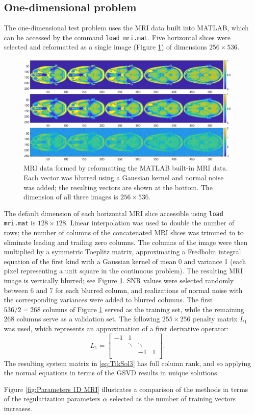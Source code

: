 \documentclass[12pt]{article}
\begin{document}
\subsection{One-dimensional problem} \label{sec:1D}
The one-dimensional test problem uses the MRI data built into MATLAB, which can be accessed by the command \texttt{load mri.mat}. Five horizontal slices were selected and reformatted as a single image (Figure \ref{fig:MRI 1D}) of dimensions $256 \times 536$. 
\begin{figure}[ht]
\includegraphics[scale=0.32]{Figures/Full_MRI_Data.eps}
\caption{MRI data formed by reformatting the MATLAB built-in MRI data. Each vector was blurred using a Gaussian kernel and normal noise was added; the resulting vectors are shown at the bottom. The dimension of all three images is $256 \times 536$.}
\label{fig:MRI 1D}
\end{figure}
The default dimension of each horizontal MRI slice accessible using \texttt{load mri.mat} is $128 \times 128$. Linear interpolation was used to double the number of rows; the number of columns of the concatenated MRI slices was trimmed to to eliminate leading and trailing zero columns. The columns of the image were then multiplied by a symmetric Toeplitz matrix, approximating a Fredholm integral equation of the first kind with a Gaussian kernel of mean 0 and variance 1 (each pixel representing a unit square in the continuous problem). The resulting MRI image is vertically blurred; see Figure \ref{fig:MRI 1D}. SNR values were selected randomly between 6 and 7 for each blurred column, and realizations of normal noise with the corresponding variances were added to blurred columns. The first $536/2 = 268$ columns of Figure \ref{fig:MRI 1D} served as the training set, while the remaining 268 columns serve as a validation set.  The following $255 \times 256$ penalty matrix $L_1$ was used, which represents an approximation of a first derivative operator:
\[L_1 = \begin{bmatrix}
-1 & 1 & &  \\
 & \ddots &  \ddots & \\
 & & -1 & 1 \\
\end{bmatrix}.\]
The resulting system matrix in \eqref{eq:TikSol3} has full column rank, and so applying the normal equations in terms of the GSVD results in unique solutions. \par 
Figure \ref{fig:Parameters 1D MRI} illustrates a comparison of the methods in terms of the regularization parameters $\alpha$ selected as the number of training vectors increases. 
\end{document}
